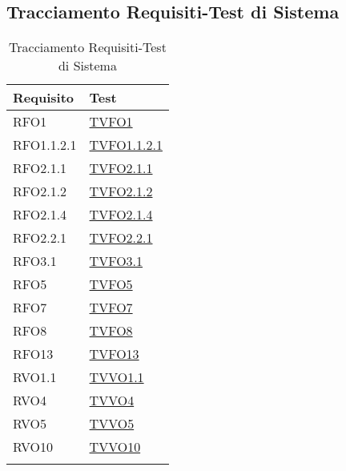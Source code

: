 \subsection{Tracciamento Requisiti-Test di Sistema}
\normalsize
\begin{longtable}{|>{\centering}m{5cm}|m{5cm}<{\centering}|}
\hline 
\textbf{Requisito} & \textbf{Test}\\
\hline
\endhead
RFO1 & \hyperlink{TVFO1}{TVFO1}\\ \hline
RFO1.1.2.1 & \hyperlink{TVFO1.1.2.1}{TVFO1.1.2.1}\\ \hline
RFO2.1.1 & \hyperlink{TVFO2.1.1}{TVFO2.1.1}\\ \hline
RFO2.1.2 & \hyperlink{TVFO2.1.2}{TVFO2.1.2}\\ \hline
RFO2.1.4 & \hyperlink{TVFO2.1.4}{TVFO2.1.4}\\ \hline
RFO2.2.1 & \hyperlink{TVFO2.2.1}{TVFO2.2.1}\\ \hline
RFO3.1 & \hyperlink{TVFO3.1}{TVFO3.1}\\ \hline
RFO5 & \hyperlink{TVFO5}{TVFO5}\\ \hline
RFO7 & \hyperlink{TVFO7}{TVFO7}\\ \hline
RFO8 & \hyperlink{TVFO8}{TVFO8}\\ \hline
RFO13 & \hyperlink{TVFO13}{TVFO13}\\ \hline
RVO1.1 & \hyperlink{TVVO1.1}{TVVO1.1}\\ \hline
RVO4 & \hyperlink{TVVO4}{TVVO4}\\ \hline
RVO5 & \hyperlink{TVVO5}{TVVO5}\\ \hline
RVO10 & \hyperlink{TVVO10}{TVVO10}\\ \hline
\caption[Tracciamento Requisiti-Test di Sistema]{Tracciamento Requisiti-Test di Sistema}
\label{tabella:requi-tv}
\end{longtable}
\clearpage
